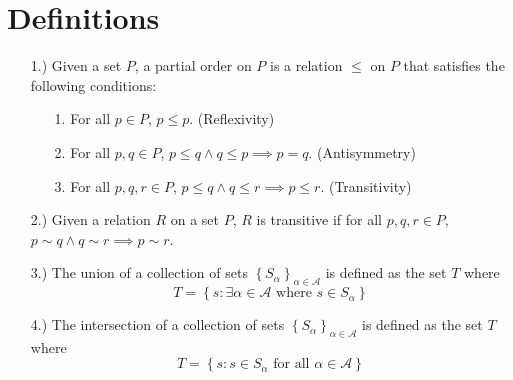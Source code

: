 \documentclass[12pt]{article}
\newcommand{\braces}[1]{\left\{#1\right\}}           %
\begin{document}
\pagestyle{fancy}
\fancyhead{}

\normalsize

\section*{Definitions}
\begin{itemize}
    \item [1.)] Given a set $P$, a partial order on $P$ is a relation $\leq$ on $P$ that satisfies the following conditions:
    \begin{itemize}
        \item [1.] For all $p\in P$, $p\leq p$. (Reflexivity)
        \item [2.] For all $p,q\in P$, $p\leq q\land q\leq p\implies p=q$. (Antisymmetry)
        \item [3.] For all $p,q,r\in P$, $p\leq q\land q\leq r\implies p\leq r$. (Transitivity)
    \end{itemize}

    \item [2.)] Given a relation $R$ on a set $P$, $R$ is transitive if for all $p,q,r\in P$, $p\sim q\land q\sim r\implies p\sim r$.
    
    \item [3.)] The union of a collection of sets $\braces{S_\alpha}_{\alpha\in\mathcal{A}}$ is defined as the set $T$ where
    \[T=\braces{s:\exists\alpha\in \mathcal{A}\text{ where }s\in S_\alpha}\]

    \item [4.)] The intersection of a collection of sets $\braces{S_\alpha}_{\alpha\in\mathcal{A}}$ is defined as the set $T$ where
    \[T=\braces{s:s\in S_\alpha\text{ for all }\alpha\in\mathcal{A}}\]
\end{itemize}
\end{document}
